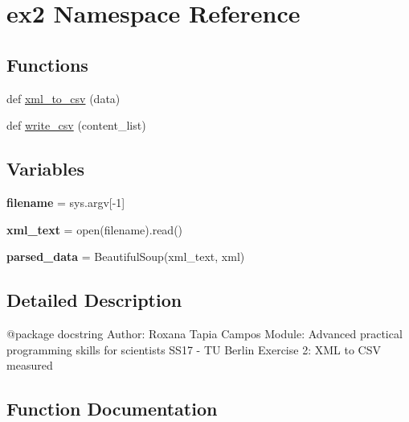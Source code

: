 \hypertarget{namespaceex2}{}\section{ex2 Namespace Reference}
\label{namespaceex2}
\subsection*{Functions}
\begin{DoxyCompactItemize}
\item 
def \hyperlink{namespaceex2_a0141c6ec7022817f6ff1fafcf5084bb4}{xml\+\_\+to\+\_\+csv} (data)
\item 
def \hyperlink{namespaceex2_a9e793b6b572f88680b5add03e52e5cfd}{write\+\_\+csv} (content\+\_\+list)
\end{DoxyCompactItemize}
\subsection*{Variables}
\begin{DoxyCompactItemize}
\item 
\mbox{\label{namespaceex2_a9abd3e03ae1c6d6a4eee43e549ffc5e0}} 
{\bfseries filename} = sys.\+argv\mbox{[}-\/1\mbox{]}
\item 
\mbox{\label{namespaceex2_ae4ee37a05da6503a8d80f884f2b8e20f}} 
{\bfseries xml\+\_\+text} = open(filename).read()
\item 
\mbox{\label{namespaceex2_a321af50e570d6dfba7da48fd26cb5b40}} 
{\bfseries parsed\+\_\+data} = Beautiful\+Soup(xml\+\_\+text, \textquotesingle{}xml\textquotesingle{})
\end{DoxyCompactItemize}


\subsection{Detailed Description}
\begin{DoxyVerb}@package docstring
Author: Roxana Tapia Campos
Module: Advanced practical programming skills for scientists
SS17 - TU Berlin 
Exercise 2: XML to CSV measured
\end{DoxyVerb}
 

\subsection{Function Documentation}
\mbox{\label{namespaceex2_a9e793b6b572f88680b5add03e52e5cfd}} 
